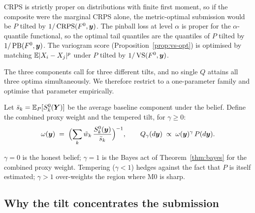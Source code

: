 \begin{corollary}
CRPS is strictly proper on distributions with finite first moment, so if the composite were the marginal CRPS alone, the metric-optimal
submission would be $P$ tilted by $1/\operatorname{CRPS}(F^0,\bm y)$. The pinball loss at level $\alpha$ is proper for the $\alpha$-quantile functional, so the
optimal tail quantiles are the quantiles of $P$ tilted by $1/\operatorname{PB}(F^0,\bm y)$. The variogram score (Proposition~\ref{prop:vs-opt}) is optimised by
matching $\mathbb{E}|X_i-X_j|^p$ under $P$ tilted by $1/\operatorname{VS}(F^0,\bm y)$.
\end{corollary}

The three components call for three different tilts, and no single $Q$ attains all three optima simultaneously. We therefore restrict to a
one-parameter family and optimise that parameter empirically.

\begin{definition}\label{def:tempered}
Let $\bar s_k=\mathbb{E}_{P}[S^0_k(\bm Y)]$ be the average baseline component under the belief. Define the combined proxy weight and the tempered
tilt, for $\gamma\ge0$:
\begin{equation}\label{eq:weight}
  \omega(\bm y) \;=\; \Bigl(\sum_k \tilde w_k\,\frac{S^0_k(\bm y)}{\bar s_k}\Bigr)^{-1},\qquad
  Q_\gamma(d\bm y)\;\propto\;\omega(\bm y)^{\gamma}\,P(d\bm y).
\end{equation}
\end{definition}
$\gamma=0$ is the honest belief; $\gamma=1$ is the Bayes act of Theorem~\ref{thm:bayes} for the combined proxy weight. Tempering ($\gamma<1$)
hedges against the fact that $P$ is itself estimated; $\gamma>1$ over-weights the region where M0 is sharp.

\subsection{Why the tilt concentrates the submission}

